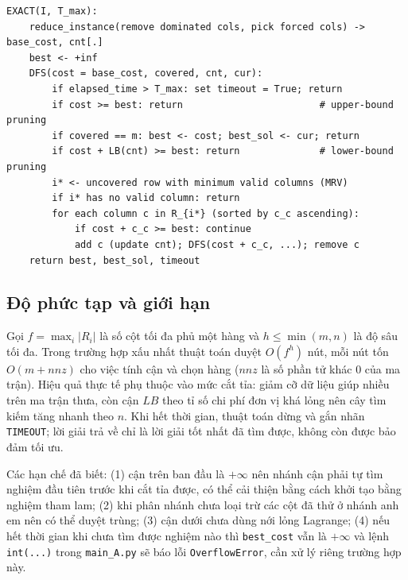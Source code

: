 \documentclass[a4paper,12pt]{article}
\begin{document}
\begin{Verbatim}
EXACT(I, T_max):
    reduce_instance(remove dominated cols, pick forced cols) -> base_cost, cnt[.]
    best <- +inf
    DFS(cost = base_cost, covered, cnt, cur):
        if elapsed_time > T_max: set timeout = True; return
        if cost >= best: return                        # upper-bound pruning
        if covered == m: best <- cost; best_sol <- cur; return
        if cost + LB(cnt) >= best: return              # lower-bound pruning
        i* <- uncovered row with minimum valid columns (MRV)
        if i* has no valid column: return
        for each column c in R_{i*} (sorted by c_c ascending):
            if cost + c_c >= best: continue
            add c (update cnt); DFS(cost + c_c, ...); remove c
    return best, best_sol, timeout
\end{Verbatim}

\subsection{Độ phức tạp và giới hạn}
Gọi $f=\max_i|R_i|$ là số cột tối đa phủ một hàng và $h\le\min(m,n)$ là độ sâu tối đa. Trong trường hợp xấu nhất thuật toán duyệt $O(f^h)$ nút, mỗi nút tốn $O(m+nnz)$ cho việc tính cận và chọn hàng ($nnz$ là số phần tử khác 0 của ma trận). Hiệu quả thực tế phụ thuộc vào mức cắt tỉa: giảm cỡ dữ liệu giúp nhiều trên ma trận thưa, còn cận $LB$ theo tỉ số chi phí đơn vị khá lỏng nên cây tìm kiếm tăng nhanh theo $n$. Khi hết thời gian, thuật toán dừng và gắn nhãn \texttt{TIMEOUT}; lời giải trả về chỉ là lời giải tốt nhất đã tìm được, không còn được bảo đảm tối ưu.

Các hạn chế đã biết: (1) cận trên ban đầu là $+\infty$ nên nhánh cận phải tự tìm nghiệm đầu tiên trước khi cắt tỉa được, có thể cải thiện bằng cách khởi tạo bằng nghiệm tham lam; (2) khi phân nhánh chưa loại trừ các cột đã thử ở nhánh anh em nên có thể duyệt trùng; (3) cận dưới chưa dùng nới lỏng Lagrange; (4) nếu hết thời gian khi chưa tìm được nghiệm nào thì \texttt{best\_cost} vẫn là $+\infty$ và lệnh \texttt{int(...)} trong \texttt{main\_A.py} sẽ báo lỗi \texttt{OverflowError}, cần xử lý riêng trường hợp này.
\end{document}
